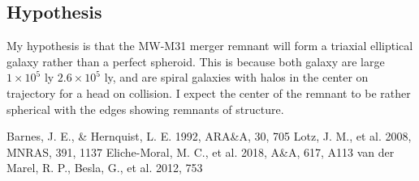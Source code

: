 \documentclass[usenatbib]{mnras}
\begin{document}
\subsection{Hypothesis}
My hypothesis is that the MW-M31 merger remnant will form a triaxial elliptical galaxy rather than a perfect spheroid. This is because both galaxy are large$1 \times 10^5$ ly
$2.6 \times 10^5$ ly, and are spiral galaxies with halos in the center on trajectory for a head on collision. I expect the center of the remnant to be rather spherical with the edges showing remnants of structure. 



\begin{thebibliography}{}
 Barnes, J. E., \& Hernquist, L. E. 1992, ARA\&A, 30, 705
 Lotz, J. M., et al. 2008, MNRAS, 391, 1137
 Eliche-Moral, M. C., et al. 2018, A\&A, 617, A113
 van der Marel, R. P., Besla, G., et al. 2012, 753
\end{thebibliography}
\end{document}
